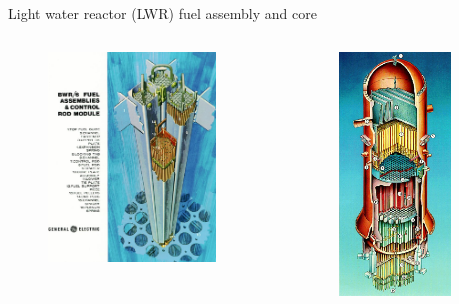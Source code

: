 \documentclass{beamer}
\begin{document}
    \begin{frame}{Light water reactor (LWR) fuel assembly and core}
        \begin{columns}[T]

            \begin{column}{0.5\textwidth}
                \begin{figure}
                    \centering
                    \includegraphics[width=12em]{./img/bwrFuel.png} \\
                    \caption*{}
                \end{figure}
            \end{column}

            \begin{column}{0.5\textwidth}
                \begin{figure}
                    \centering
                    \includegraphics[width=8em]{./img/bwrCore.png} \\
                    \caption*{}
                \end{figure}
            \end{column}

        \end{columns}

    \end{frame}
\end{document}
